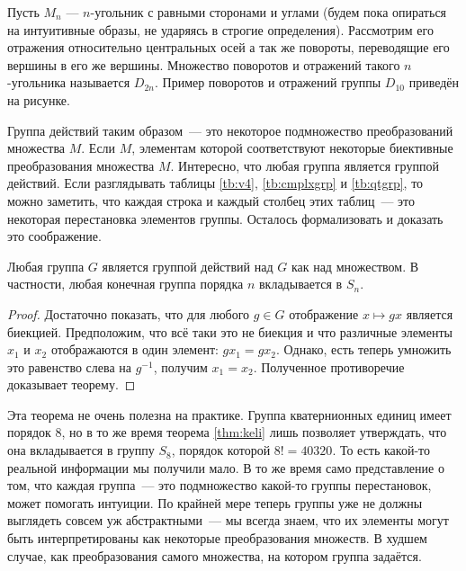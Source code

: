 \begin{definition}
	Пусть $M_n$ — $n$-угольник с равными сторонами и углами (будем пока опираться на интуитивные образы, не ударяясь в строгие определения). Рассмотрим его отражения относительно центральных осей а так же повороты, переводящие его вершины в его же вершины. Множество поворотов и отражений такого $n$-угольника называется  $D_{2n}$. Пример поворотов и отражений группы $D_{10}$ приведён на рисунке.
\end{definition}


Группа действий таким образом~— это некоторое подмножество преобразований множества $M$. Если $M$, элементам которой соответствуют некоторые биективные преобразования множества $M$. Интересно, что любая группа является группой действий. Если разглядывать таблицы \ref{tb:v4}, \ref{tb:cmplxgrp} и \ref{tb:qtgrp}, то можно заметить, что каждая строка и каждый столбец этих таблиц~— это некоторая перестановка элементов группы. Осталось формализовать и доказать это соображение.

\begin{thm}\label{thm:keli}
	Любая группа $G$ является группой действий над $G$ как над множеством. В частности, любая конечная группа порядка $n$ вкладывается в $S_n$.
\end{thm}
\begin{proof}
	Достаточно показать, что для любого $g\in G$ отображение $x\mapsto gx$ является биекцией. Предположим, что всё таки это не биекция и что различные элементы $x_1$ и $x_2$ отображаются в один элемент: $gx_1 = gx_2$. Однако, есть теперь умножить это равенство слева на $g^{-1}$, получим $x_1 = x_2$. Полученное противоречие доказывает теорему.
\end{proof}

Эта теорема не очень полезна на практике. Группа кватернионных единиц имеет порядок 8, но в то же время теорема \ref{thm:keli} лишь позволяет утверждать, что она вкладывается в группу $S_8$, порядок которой $8!=40320$. То есть какой-то реальной информации мы получили мало. В то же время само представление о том, что каждая группа~— это подмножество какой-то группы перестановок, может помогать интуиции. По крайней мере теперь группы уже не должны выглядеть совсем уж абстрактными~— мы всегда знаем, что их элементы могут быть интерпретированы как некоторые преобразования множеств. В худшем случае, как преобразования самого множества, на котором группа задаётся.

